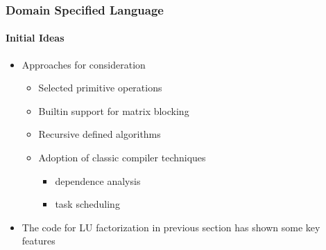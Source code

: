 \documentclass[aspectratio=169]{beamer}
\begin{document}
\begin{frame}
  \frametitle{Domain Specified Language}
  \framesubtitle{Initial Ideas}
  \begin{itemize}
  \item Approaches for consideration
    \begin{itemize}
    \item Selected primitive operations
    \item Builtin support for matrix blocking
    \item Recursive defined algorithms
    \item Adoption of classic compiler techniques
      \begin{itemize}
      \item dependence analysis
      \item task scheduling
      \end{itemize}
    \end{itemize}
  \item The code for LU factorization in previous section has shown
    some key features
  \end{itemize}
\end{frame}
\end{document}
